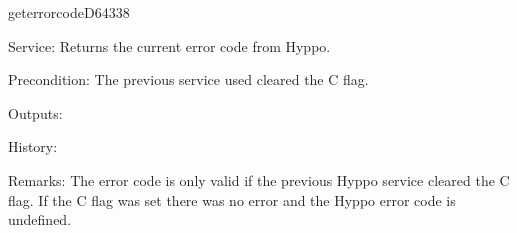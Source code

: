 \begin{hyppotrap}{geterrorcode}{D643}{38}
\item [Service:]
  Returns the current error code from Hyppo.
\item [Precondition:]
  The previous service used cleared the C flag.
\item [Outputs:]
\item [History:]
\item [Remarks:]
  The error code is only valid if the previous Hyppo service cleared the C flag.
  If the C flag was set there was no error and the Hyppo error code is
  undefined.


\end{hyppotrap}
